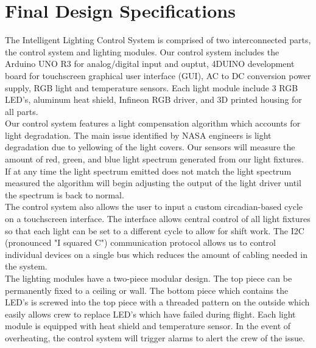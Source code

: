\documentclass[12pt,a4paper]{report}
\begin{document}
\section{Final Design Specifications}

The Intelligent Lighting Control System is comprised of two interconnected parts, the control system and lighting modules. Our control system includes the Arduino UNO R3 for analog/digital input and ouptut, 4DUINO development board for touchscreen graphical user interface (GUI), AC to DC conversion power supply, RGB light and temperature sensors. Each light module include 3 RGB LED's, aluminum heat shield, Infineon RGB driver, and 3D printed housing for all parts.\\ \linebreak
Our control system features a light compensation algorithm which accounts for light degradation. The main issue identified by NASA engineers is light degradation due to yellowing of the light covers. Our sensors will measure the amount of red, green, and blue light spectrum generated from our light fixtures. If at any time the light spectrum emitted does not match the light spectrum measured the algorithm will begin adjusting the output of the light driver until the spectrum is back to normal.\\ \linebreak
The control system also allows the user to input a custom circadian-based cycle on a touchscreen interface. The interface allows central control of all light fixtures so that each light can be set to a different cycle to allow for shift work. The I2C (pronounced "I squared C") communication protocol allows us to control individual devices on a single bus which reduces the amount of cabling needed in the system.\\ \linebreak
The lighting modules have a two-piece modular design. The top piece can be permanently fixed to a ceiling or wall. The bottom piece which contains the LED's is screwed into the top piece with a threaded pattern on the outside which easily allows crew to replace LED's which have failed during flight. Each light module is equipped with heat shield and temperature sensor. In the event of overheating, the control system will trigger alarms to alert the crew of the issue.
\end{document}
